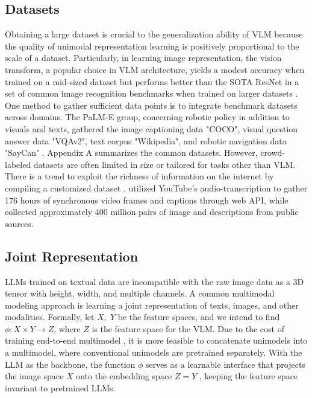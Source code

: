 \documentclass[11pt]{article}
\begin{document}
\subsection{Datasets}
Obtaining a large dataset is crucial to the generalization ability of VLM because the quality of unimodal representation learning is positively proportional to the scale of a dataset. Particularly, in learning image representation, the vision transform, a popular choice in VLM architecture, yields a modest accuracy when trained on a mid-sized dataset but performs better than the SOTA ResNet in a set of common image recognition benchmarks when trained on larger datasets \citep{DBLP:conf/iclr/DosovitskiyB0WZ21}. One method to gather sufficient data points is to integrate benchmark datasets across domains. The PaLM-E group, concerning robotic policy in addition to visuals and texts, gathered the image captioning data "COCO", visual question answer data "VQAv2", text corpus "Wikipedia", and robotic navigation data "SayCan" \citet{DBLP:conf/icml/DriessXSLCIWTVY23}. Appendix A summarizes the common datasets. However, crowd-labeled datasets are often limited in size or tailored for tasks other than VLM. There is a trend to exploit the richness of information on the internet by compiling a customized dataset \citep{DBLP:conf/icml/RadfordKHRGASAM21}. \citet{DBLP:conf/iccv/SunMV0S19} utilized YouTube's audio-transcription to gather 176 hours of synchronous video frames and captions through web API, while \citet{DBLP:conf/icml/RadfordKHRGASAM21} collected approximately 400 million pairs of image and descriptions from public sources. 


\subsection{Joint Representation}
LLMs trained on textual data are incompatible with the raw image data as a 3D tensor with height, width, and multiple channels. A common multimodal modeling approach is learning a joint representation of texts, images, and other modalities. Formally, let $X,\; Y$ be the feature spaces, and we intend to find $\phi: X\times Y \rightarrow Z$, where $Z$ is the feature space for the VLM. Due to the cost of training end-to-end multimodel \citep{DBLP:journals/corr/abs-2306-13549}, it is more feasible to concatenate unimodels into a multimodel, where conventional unimodels are pretrained separately. With the LLM as the backbone, the function $\phi$ serves as a learnable interface that projects the image space $X$ onto the embedding space $Z=Y$ \citep{DBLP:journals/corr/abs-2306-13549}, keeping the feature space invariant to pretrained LLMs. 
\end{document}
